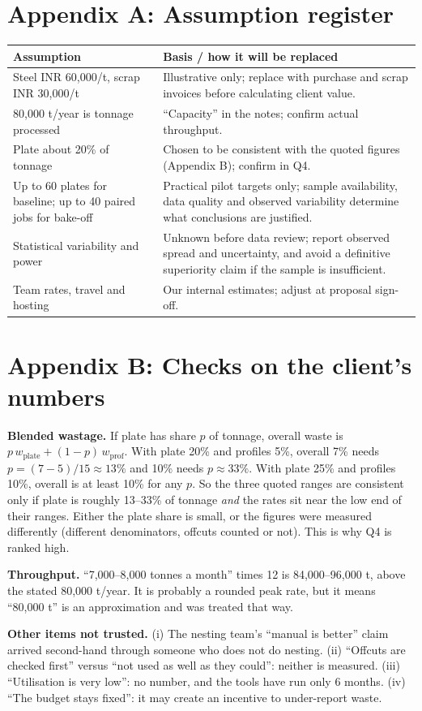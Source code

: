 \documentclass[10pt,a4paper]{article}
\begin{document}
\section{Appendix A: Assumption register}
\small
\begin{tabular}{@{}P{6.5cm}P{9.4cm}@{}}
\toprule
\textbf{Assumption} & \textbf{Basis / how it will be replaced} \\
\midrule
Steel INR 60{,}000/t, scrap INR 30{,}000/t & Illustrative only; replace with purchase and scrap invoices before calculating client value. \\
80{,}000 t/year is tonnage processed & ``Capacity'' in the notes; confirm actual throughput. \\
Plate about 20\% of tonnage & Chosen to be consistent with the quoted figures (Appendix B); confirm in Q4. \\
Up to 60 plates for baseline; up to 40 paired jobs for bake-off & Practical pilot targets only; sample availability, data quality and observed variability determine what conclusions are justified. \\
Statistical variability and power & Unknown before data review; report observed spread and uncertainty, and avoid a definitive superiority claim if the sample is insufficient. \\
Team rates, travel and hosting & Our internal estimates; adjust at proposal sign-off. \\
\bottomrule
\end{tabular}
\normalsize

\section{Appendix B: Checks on the client's numbers}
\textbf{Blended wastage.} If plate has share $p$ of tonnage, overall waste is $p\,w_{\text{plate}}+(1-p)\,w_{\text{prof}}$. With plate 20\% and profiles 5\%, overall 7\% needs $p=(7-5)/15\approx13\%$ and 10\% needs $p\approx33\%$. With plate 25\% and profiles 10\%, overall is at least 10\% for any $p$. So the three quoted ranges are consistent only if plate is roughly 13--33\% of tonnage \emph{and} the rates sit near the low end of their ranges. Either the plate share is small, or the figures were measured differently (different denominators, offcuts counted or not). This is why Q4 is ranked high.

\textbf{Throughput.} ``7{,}000--8{,}000 tonnes a month'' times 12 is 84{,}000--96{,}000 t, above the stated 80{,}000 t/year. It is probably a rounded peak rate, but it means ``80{,}000 t'' is an approximation and was treated that way.

\textbf{Other items not trusted.} (i) The nesting team's ``manual is better'' claim arrived second-hand through someone who does not do nesting. (ii) ``Offcuts are checked first'' versus ``not used as well as they could'': neither is measured. (iii) ``Utilisation is very low'': no number, and the tools have run only 6 months. (iv) ``The budget stays fixed'': it may create an incentive to under-report waste.
\end{document}
